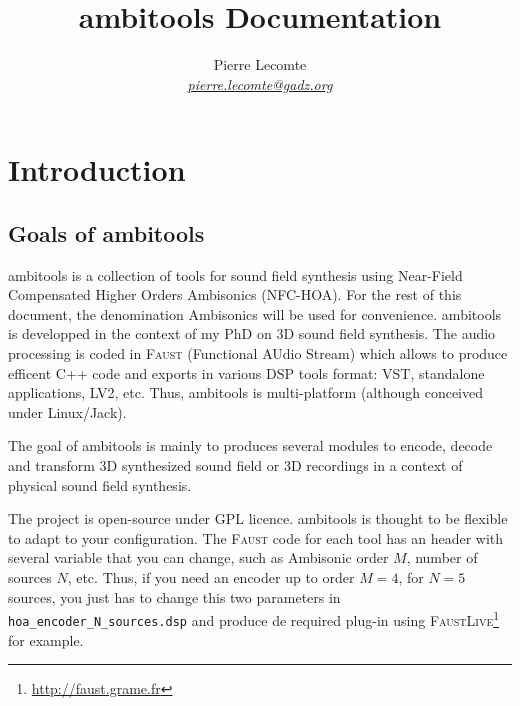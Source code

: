 \documentclass[10pt,a4paper]{article}
\author{Pierre Lecomte \\ \textit{ \href{mailto:pierre.lecomte@gadz.org}{pierre.lecomte@gadz.org}}}
\title{ambitools Documentation}
\begin{document}

\makeatletter
\newcommand\footnoteref[1]{\protected@xdef\@thefnmark{\ref{#1}}\@footnotemark}
\makeatother

\maketitle
\tableofcontents
\section{Introduction}

\subsection{Goals of ambitools}
ambitools is a collection of tools for sound field synthesis using Near-Field Compensated Higher Orders Ambisonics (NFC-HOA). For the rest of this document, the denomination Ambisonics will be used for convenience.
ambitools is developped in the context of my PhD on 3D sound field synthesis. The audio processing is coded in \textsc{Faust}\footnoteref{faustlive} (Functional AUdio Stream) which allows to produce efficent C++ code and exports in various DSP tools format: VST, standalone applications, LV2, etc. Thus, ambitools is multi-platform (although conceived under Linux/Jack).

The goal of ambitools is mainly to produces several modules to encode, decode and transform 3D synthesized sound field or 3D recordings in a context of physical sound field synthesis. 

The project is open-source under GPL licence. ambitools is thought to be flexible to adapt to your configuration. The \textsc{Faust} code for each tool has an header with several variable that you can change, such as Ambisonic order $M$, number of sources $N$, etc. Thus, if you need an encoder up to order $M=4$, for $N=5$ sources, you just has to change this two parameters in \lstinline'hoa_encoder_N_sources.dsp' and produce de required plug-in using \textsc{FaustLive}\footnote{\label{faustlive}\url{http://faust.grame.fr}} for example.
\end{document}
